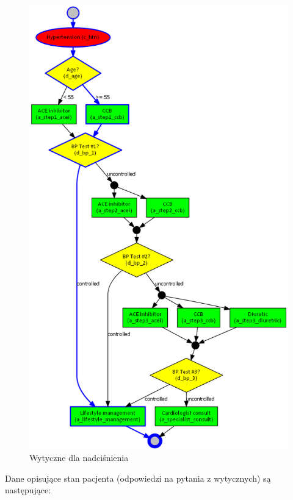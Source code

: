 \begin{figure}[H]
\centering
\includegraphics[scale=0.45]{img/htn-ver-3.png}
\caption{Wytyczne dla nadciśnienia}
\label{fig:htn}
\end{figure}
Dane opisujące stan pacjenta (odpowiedzi na pytania z wytycznych) są następujące:
